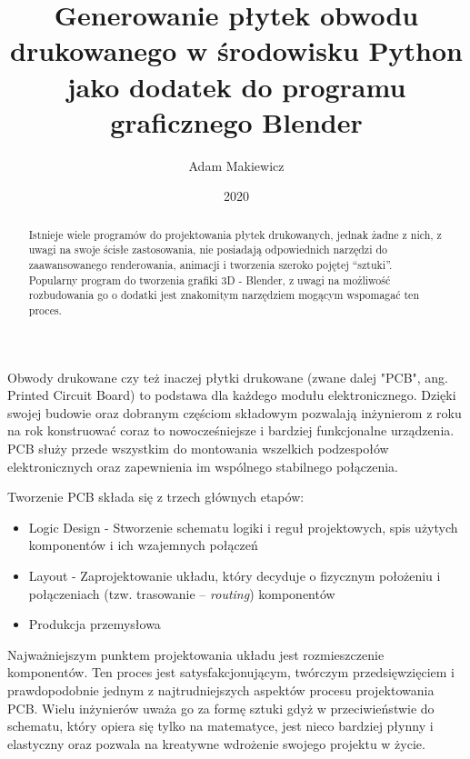 \documentclass[brudnopis]{xmgr}
\author   {Adam Makiewicz}
\title    {Generowanie płytek obwodu drukowanego w środowisku Python jako dodatek do programu graficznego Blender}
\date     {2020}
\begin{document}

\begin{abstract}
Istnieje wiele programów do projektowania płytek drukowanych, jednak żadne z nich, z uwagi na swoje ścisłe zastosowania, nie posiadają odpowiednich narzędzi do zaawansowanego renderowania, animacji i tworzenia szeroko pojętej “sztuki”. Popularny program do tworzenia grafiki 3D - Blender, z uwagi na możliwość rozbudowania go o dodatki jest znakomitym narzędziem mogącym wspomagać ten proces.
\end{abstract}



\maketitle

\introduction

Obwody drukowane czy też inaczej płytki drukowane (zwane dalej "PCB", ang. Printed Circuit Board) to podstawa dla każdego modułu elektronicznego. Dzięki swojej budowie oraz dobranym częściom składowym pozwalają inżynierom z roku na rok konstruować coraz to nowocześniejsze i bardziej funkcjonalne urządzenia. PCB służy przede wszystkim do montowania wszelkich podzespołów elektronicznych oraz zapewnienia im wspólnego stabilnego połączenia.

Tworzenie PCB składa się z trzech głównych etapów: \cite{Abboud}

\begin{itemize}
\item
Logic Design - Stworzenie schematu logiki i reguł projektowych, spis użytych komponentów i ich wzajemnych połączeń
\item
Layout - Zaprojektowanie układu, który decyduje o fizycznym położeniu i połączeniach (tzw. trasowanie -- \emph{routing}) komponentów
\item
Produkcja przemysłowa
\end{itemize}
    
    Najważniejszym punktem projektowania układu jest rozmieszczenie komponentów. Ten proces jest satysfakcjonującym, twórczym przedsięwzięciem i prawdopodobnie jednym z najtrudniejszych aspektów procesu projektowania PCB. Wielu inżynierów uważa go za formę sztuki gdyż w przeciwieństwie do schematu, który opiera się tylko na matematyce, jest nieco bardziej płynny i elastyczny oraz pozwala na kreatywne wdrożenie swojego projektu w życie.
\end{document}
